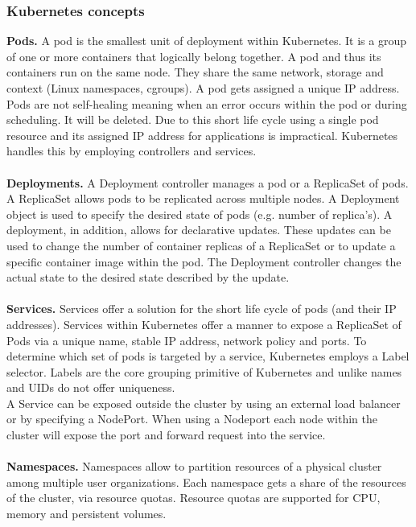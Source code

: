 \subsubsection{Kubernetes concepts}
\textbf{Pods.}  A pod is the smallest unit of deployment within Kubernetes. It is a group of one or more containers that logically belong together.   A pod and thus its containers run on the same node. They share the same network, storage and context (Linux namespaces, cgroups). A pod gets assigned a unique IP address. Pods are not self-healing meaning when an error occurs within the pod or during scheduling. It will be deleted. Due to this short life cycle using a single pod resource and its assigned IP address for applications is impractical. Kubernetes handles this by employing controllers and services.~\cite{pods}\\\\
\textbf{Deployments.}  A Deployment controller manages a pod or a ReplicaSet of pods. A ReplicaSet allows pods to be replicated across multiple nodes. A Deployment object is used to specify the desired state of pods (e.g. number of replica's). A deployment, in addition, allows for declarative updates. These updates can be used to change the number of container replicas of a ReplicaSet or to update a specific container image within the pod.  The Deployment controller changes the actual state to the desired state described by the update.~\cite{deployments}
\\\\
\textbf{Services.}  Services offer a solution for the short life cycle of pods (and their IP addresses). Services within Kubernetes offer a manner to expose a ReplicaSet of Pods via a unique name, stable IP address, network policy and ports. To determine which set of pods is targeted by a service, Kubernetes employs a Label selector. Labels are the core grouping primitive of Kubernetes and unlike names and UIDs do not offer uniqueness.\\  A Service can be exposed outside the cluster by using an external load balancer or by specifying a NodePort. When using a Nodeport each node within the cluster will expose the port and forward request into the service.~\cite{services}
\\\\
\textbf{Namespaces.}  Namespaces allow to partition resources of a physical cluster among multiple user organizations. Each namespace gets a share of the resources of the cluster, via resource quotas. Resource quotas are supported for CPU, memory and persistent volumes.~\cite{namespaces-k8}
